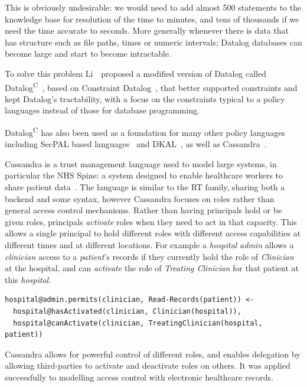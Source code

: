 \documentclass[thesis.tex]{subfiles}
\begin{document}
This is obviously undesirable: we would need to add almost 500
statements to the knowledge base for resolution of the time to
minutes, and tens of thousands if we need the time accurate to
seconds.  More generally whenever there is data that has structure
such as file paths, times or numeric intervals; Datalog databases can
become large and start to become intractable.

To solve this problem Li~\etal{}~proposed a modified version of
Datalog called Datalog\textsuperscript{C}~\cite{li_datalog_2003},
based on Constraint
Datalog~\cite{revesz_constraint_1995,revesz_safe_1998}, that better
supported constraints and kept Datalog's tractability, with a focus on
the constraints typical to a policy languages instead of those for
database programming.

Datalog\textsuperscript{C} has also been used as a foundation for many
other policy languages including SecPAL based
languages~\cite{aziz_secpal4dsa:_2011,becker_secpal:_2010,becker_framework_2009}
and DKAL~\cite{gurevich_dkal:_2008}, as well as
Cassandra~\cite{becker_cassandra:_2004}.

Cassandra is a trust management language used to model large systems,
in particular the NHS Spine: a system designed to enable healthcare
workers to share patient
data~\cite{becker_cassandra:_2004,becker_cassandra:_2004-1}.  The
language is similar to the RT family, sharing both a backend and some
syntax, however Cassandra focuses on roles rather than general access
control mechanisms.  Rather than having principals hold or be given
roles, principals \emph{activate} roles when they need to act in that
capacity.  This allows a single principal to hold different roles with
different access capabilities at different times and at different
locations.  For example a \emph{hospital} \emph{admin} allows a
\emph{clinician} access to a \emph{patient}'s records if they
currently hold the role of \emph{Clinician} at the hospital, and can
\emph{activate} the role of \emph{Treating Clinician} for that patient
at this \emph{hospital}.

\begin{lstlisting}
hospital@admin.permits(clinician, Read-Records(patient)) <-
  hospital@hasActivated(clinician, Clinician(hospital)),
  hospital@canActivate(clinician, TreatingClinician(hospital, patient))
\end{lstlisting}

Cassandra allows for powerful control of different roles, and enables
delegation by allowing third-parties to activate and deactivate roles
on others.  It was applied successfully to modelling access control
with electronic healthcare records.
\end{document}
